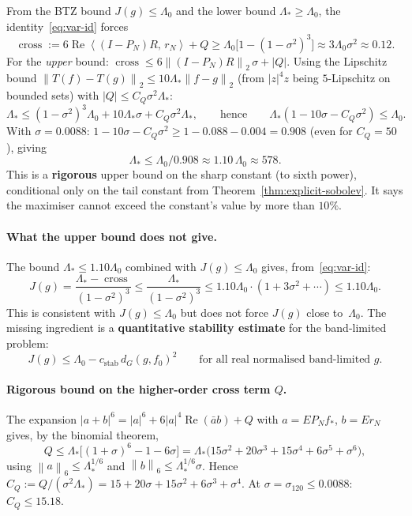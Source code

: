 \documentclass[12pt]{article}
\theoremstyle{definition}
\theoremstyle{remark}
\newcommand{\norm}[1]{\left\|#1\right\|}
\newcommand{\ip}[2]{\left\langle #1,\, #2\right\rangle}
\newcommand{\re}{\operatorname{Re}}
\begin{document}
From the BTZ bound $J(g)\leq\Lambda_0$ and the lower bound
$\Lambda_*\geq\Lambda_0$, the identity~\eqref{eq:var-id} forces
\begin{equation}\label{eq:cross-lower}
  \operatorname{cross}
  :=
  6\re\ip{(I-P_N)R}{r_N}+Q
  \geq\Lambda_0\bigl[1-(1-\sigma^2)^3\bigr]
  \approx 3\Lambda_0\sigma^2\approx 0.12.
\end{equation}
For the \emph{upper} bound: $\operatorname{cross}\leq
6\norm{(I-P_N)R}_2\,\sigma+|Q|$.  Using the Lipschitz bound
$\norm{T(f)-T(g)}_2\leq 10\Lambda_*\norm{f-g}_2$ (from
$|z|^4z$ being $5$-Lipschitz on bounded sets) with $|Q|\leq C_Q\sigma^2\Lambda_*$:
\[
  \Lambda_*
  \leq(1-\sigma^2)^3\Lambda_0+10\Lambda_*\sigma+C_Q\sigma^2\Lambda_*,
  \qquad\text{hence}\qquad
  \Lambda_*(1-10\sigma-C_Q\sigma^2)
  \leq\Lambda_0.
\]
With $\sigma=0.0088$: $1-10\sigma-C_Q\sigma^2\geq 1-0.088-0.004=0.908$
(even for $C_Q=50$), giving
\begin{equation}\label{eq:Lambda-upper-120}
  \boxed{\Lambda_*\leq\Lambda_0/0.908\approx 1.10\,\Lambda_0\approx 578.}
\end{equation}
This is a \textbf{rigorous} upper bound on the sharp constant (to
sixth power), conditional only on the tail constant from
Theorem~\ref{thm:explicit-sobolev}.  It says the maximiser cannot
exceed the constant's value by more than $10\%$.

\paragraph{What the upper bound does not give.}
The bound $\Lambda_*\leq 1.10\Lambda_0$ combined with $J(g)\leq\Lambda_0$
gives, from~\eqref{eq:var-id}:
\[
  J(g)
  =\frac{\Lambda_*-\operatorname{cross}}{(1-\sigma^2)^3}
  \leq\frac{\Lambda_*}{(1-\sigma^2)^3}
  \leq 1.10\Lambda_0\cdot(1+3\sigma^2+\cdots)
  \leq 1.10\Lambda_0.
\]
This is consistent with $J(g)\leq\Lambda_0$ but does not force $J(g)$
close to~$\Lambda_0$.  The missing ingredient is a \textbf{quantitative
stability estimate} for the band-limited problem:
\begin{equation}\label{eq:global-stability}
  J(g)\leq\Lambda_0-c_{\mathrm{stab}}\,d_G(g,f_0)^2
  \qquad\text{for all real normalised band-limited }g.
\end{equation}

\paragraph{Rigorous bound on the higher-order cross term $Q$.}
The expansion $|a+b|^6=|a|^6+6|a|^4\re(\bar ab)+Q$ with
$a=EP_Nf_*$, $b=Er_N$ gives, by the binomial theorem,
\begin{equation}\label{eq:CQ-rigorous}
  Q\leq\Lambda_*\bigl[(1+\sigma)^6-1-6\sigma\bigr]
  =\Lambda_*\bigl(15\sigma^2+20\sigma^3+15\sigma^4+6\sigma^5+\sigma^6\bigr),
\end{equation}
using $\norm{a}_6\leq\Lambda_*^{1/6}$ and $\norm{b}_6\leq\Lambda_*^{1/6}\sigma$.
Hence $C_Q:=Q/(\sigma^2\Lambda_*)=15+20\sigma+15\sigma^2+6\sigma^3+\sigma^4$.
At $\sigma=\sigma_{120}\leq 0.0088$: $C_Q\leq 15.18$.
\end{document}
